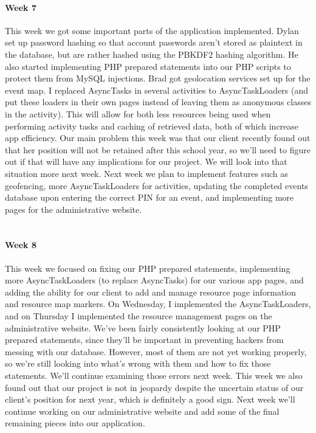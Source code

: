 \documentclass[onecolumn, draftclsnofoot,10pt, compsoc]{IEEEtran}
\begin{document}
      \paragraph{Week 7}
      This week we got some important parts of the application implemented. Dylan set up password hashing so that account passwords aren't stored as plaintext in the database, but are rather hashed using the PBKDF2 hashing algorithm. He also started implementing PHP prepared statements into our PHP scripts to protect them from MySQL injections. Brad got geolocation services set up for the event map. I replaced AsyncTasks in several activities to AsyncTaskLoaders (and put these loaders in their own pages instead of leaving them as anonymous classes in the activity). This will allow for both less resources being used when performing activity tasks and caching of retrieved data, both of which increase app efficiency. Our main problem this week was that our client recently found out that her position will not be retained after this school year, so we'll need to figure out if that will have any implications for our project. We will look into that situation more next week. Next week we plan to implement features such as geofencing, more AsyncTaskLoaders for activities, updating the completed events database upon entering the correct PIN for an event, and implementing more pages for the administrative website. \\ \\

      \paragraph{Week 8}
      This week we focused on fixing our PHP prepared statements, implementing more AsyncTaskLoaders (to replace AsyncTasks) for our various app pages, and adding the ability for our client to add and manage resource page information and resource map markers. On Wednesday, I implemented the AsyncTaskLoaders, and on Thursday I implemented the resource management pages on the administrative website. We've been fairly consistently looking at our PHP prepared statements, since they'll be important in preventing hackers from messing with our database. However, most of them are not yet working properly, so we're still looking into what's wrong with them and how to fix those statements. We'll continue examining those errors next week. This week we also found out that our project is not in jeopardy despite the uncertain status of our client's position for next year, which is definitely a good sign. Next week we'll continue working on our administrative website and add some of the final remaining pieces into our application. \\ \\
\end{document}
